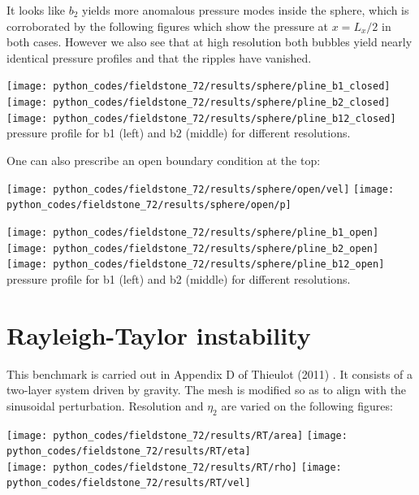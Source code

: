 It looks like $b_2$ yields more anomalous pressure modes inside the sphere, 
which is corroborated by the following figures which show the pressure 
at $x=L_x/2$ in both cases. However we also see that at high resolution both 
bubbles yield nearly identical pressure profiles and that the ripples have vanished. 

\begin{center}
\texttt{[image: python\_codes/fieldstone\_72/results/sphere/pline\_b1\_closed]}
\texttt{[image: python\_codes/fieldstone\_72/results/sphere/pline\_b2\_closed]}
\texttt{[image: python\_codes/fieldstone\_72/results/sphere/pline\_b12\_closed]}\\
{\captionfont pressure profile for b1 (left) and b2 (middle) for different resolutions.}
\end{center}

One can also prescribe an open boundary condition at the top:

\begin{center}
\texttt{[image: python\_codes/fieldstone\_72/results/sphere/open/vel]}
\texttt{[image: python\_codes/fieldstone\_72/results/sphere/open/p]}
\end{center}


\begin{center}
\texttt{[image: python\_codes/fieldstone\_72/results/sphere/pline\_b1\_open]}
\texttt{[image: python\_codes/fieldstone\_72/results/sphere/pline\_b2\_open]}
\texttt{[image: python\_codes/fieldstone\_72/results/sphere/pline\_b12\_open]}\\
{\captionfont pressure profile for b1 (left) and b2 (middle) for different resolutions.}
\end{center}





\section*{Rayleigh-Taylor instability}

This benchmark is carried out in Appendix D of Thieulot (2011) \cite{thie11}.
It consists of a two-layer system driven by gravity.
The mesh is modified so as to align with the sinusoidal perturbation.
Resolution and $\eta_2$ are varied on the following figures:

\begin{center}
\texttt{[image: python\_codes/fieldstone\_72/results/RT/area]}
\texttt{[image: python\_codes/fieldstone\_72/results/RT/eta]}\\
\texttt{[image: python\_codes/fieldstone\_72/results/RT/rho]}
\texttt{[image: python\_codes/fieldstone\_72/results/RT/vel]}
\end{center}


